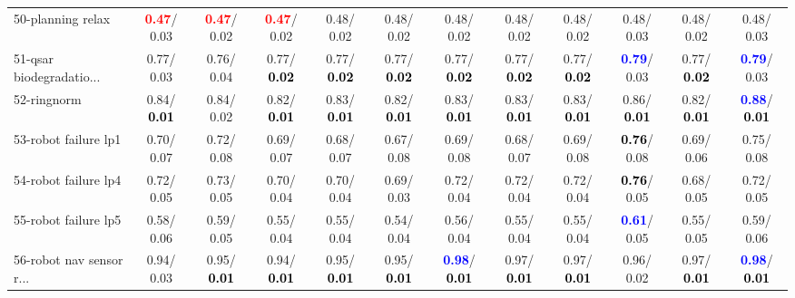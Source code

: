 \begin{table}[h]
\begin{center}
{\begin{tabular}{lc|c|c|c|c|c|c|c|c|c|c}
50-planning relax & \textcolor{red}{\textbf{  0.47}}/  0.03 & \textcolor{red}{\textbf{  0.47}}/  0.02 & \textcolor{red}{\textbf{  0.47}}/  0.02 &   0.48/  0.02 &   0.48/  0.02 &   0.48/  0.02 &   0.48/  0.02 &   0.48/  0.02 &   0.48/  0.03 &   0.48/  0.02 &   0.48/  0.03 \\
51-qsar biodegradatio... &   0.77/  0.03 &   0.76/  0.04 &   0.77/\textcolor{black}{\textbf{  0.02}} &   0.77/\textcolor{black}{\textbf{  0.02}} &   0.77/\textcolor{black}{\textbf{  0.02}} &   0.77/\textcolor{black}{\textbf{  0.02}} &   0.77/\textcolor{black}{\textbf{  0.02}} &   0.77/\textcolor{black}{\textbf{  0.02}} & \textcolor{blue}{\textbf{  0.79}}/  0.03 &   0.77/\textcolor{black}{\textbf{  0.02}} & \textcolor{blue}{\textbf{  0.79}}/  0.03 \\
52-ringnorm &   0.84/\textcolor{black}{\textbf{  0.01}} &   0.84/  0.02 &   0.82/\textcolor{black}{\textbf{  0.01}} &   0.83/\textcolor{black}{\textbf{  0.01}} &   0.82/\textcolor{black}{\textbf{  0.01}} &   0.83/\textcolor{black}{\textbf{  0.01}} &   0.83/\textcolor{black}{\textbf{  0.01}} &   0.83/\textcolor{black}{\textbf{  0.01}} &   0.86/\textcolor{black}{\textbf{  0.01}} &   0.82/\textcolor{black}{\textbf{  0.01}} & \textcolor{blue}{\textbf{  0.88}}/\textcolor{black}{\textbf{  0.01}} \\
53-robot failure lp1 &   0.70/  0.07 &   0.72/  0.08 &   0.69/  0.07 &   0.68/  0.07 &   0.67/  0.08 &   0.69/  0.08 &   0.68/  0.07 &   0.69/  0.08 & \textcolor{black}{\textbf{  0.76}}/  0.08 &   0.69/  0.06 &   0.75/  0.08 \\ \hline
54-robot failure lp4 &   0.72/  0.05 &   0.73/  0.05 &   0.70/  0.04 &   0.70/  0.04 &   0.69/  0.03 &   0.72/  0.04 &   0.72/  0.04 &   0.72/  0.04 & \textcolor{black}{\textbf{  0.76}}/  0.05 &   0.68/  0.05 &   0.72/  0.05 \\
55-robot failure lp5 &   0.58/  0.06 &   0.59/  0.05 &   0.55/  0.04 &   0.55/  0.04 &   0.54/  0.04 &   0.56/  0.04 &   0.55/  0.04 &   0.55/  0.04 & \textcolor{blue}{\textbf{  0.61}}/  0.05 &   0.55/  0.05 &   0.59/  0.06 \\
56-robot nav sensor r... &   0.94/  0.03 &   0.95/\textcolor{black}{\textbf{  0.01}} &   0.94/\textcolor{black}{\textbf{  0.01}} &   0.95/\textcolor{black}{\textbf{  0.01}} &   0.95/\textcolor{black}{\textbf{  0.01}} & \textcolor{blue}{\textbf{  0.98}}/\textcolor{black}{\textbf{  0.01}} &   0.97/\textcolor{black}{\textbf{  0.01}} &   0.97/\textcolor{black}{\textbf{  0.01}} &   0.96/  0.02 &   0.97/\textcolor{black}{\textbf{  0.01}} & \textcolor{blue}{\textbf{  0.98}}/\textcolor{black}{\textbf{  0.01}} \\

\end{tabular}}
\end{center}
\end{table}

